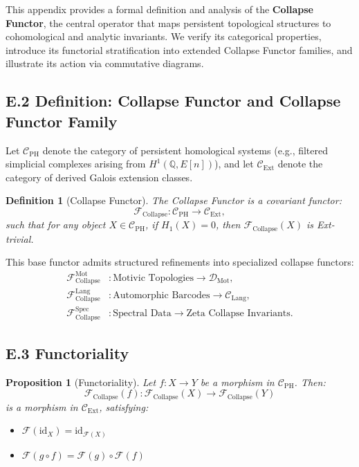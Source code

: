 \documentclass[11pt]{article}
\newtheorem{definition}[theorem]{Definition}
\newtheorem{proposition}[theorem]{Proposition}
\newcommand{\QQ}{\mathbb{Q}}
\begin{document}
This appendix provides a formal definition and analysis of the \textbf{Collapse Functor}, the central operator that maps persistent topological structures to cohomological and analytic invariants.  
We verify its categorical properties, introduce its functorial stratification into extended Collapse Functor families, and illustrate its action via commutative diagrams.

\subsection*{E.2 Definition: Collapse Functor and Collapse Functor Family}

Let $\mathcal{C}_{\mathrm{PH}}$ denote the category of persistent homological systems (e.g., filtered simplicial complexes arising from $H^1(\QQ, E[n])$), and let $\mathcal{C}_{\mathrm{Ext}}$ denote the category of derived Galois extension classes.

\begin{definition}[Collapse Functor]
The \emph{Collapse Functor} is a covariant functor:
\[
\mathcal{F}_{\mathrm{Collapse}} : \mathcal{C}_{\mathrm{PH}} \longrightarrow \mathcal{C}_{\mathrm{Ext}},
\]
such that for any object $X \in \mathcal{C}_{\mathrm{PH}}$, if $H_1(X) = 0$, then $\mathcal{F}_{\mathrm{Collapse}}(X)$ is Ext-trivial.
\end{definition}

This base functor admits structured refinements into specialized collapse functors:
\begin{align*}
\mathcal{F}_{\mathrm{Collapse}}^{\mathrm{Mot}} &: \text{Motivic Topologies} \to \mathcal{D}_{\mathrm{Mot}}, \\
\mathcal{F}_{\mathrm{Collapse}}^{\mathrm{Lang}} &: \text{Automorphic Barcodes} \to \mathcal{C}_{\mathrm{Lang}}, \\
\mathcal{F}_{\mathrm{Collapse}}^{\mathrm{Spec}} &: \text{Spectral Data} \to \text{Zeta Collapse Invariants}.
\end{align*}

\subsection*{E.3 Functoriality}

\begin{proposition}[Functoriality]
\label{prop:collapse-functoriality}
Let $f: X \to Y$ be a morphism in $\mathcal{C}_{\mathrm{PH}}$.  
Then:
\[
\mathcal{F}_{\mathrm{Collapse}}(f) : \mathcal{F}_{\mathrm{Collapse}}(X) \to \mathcal{F}_{\mathrm{Collapse}}(Y)
\]
is a morphism in $\mathcal{C}_{\mathrm{Ext}}$, satisfying:
\begin{itemize}
  \item $\mathcal{F}(\mathrm{id}_X) = \mathrm{id}_{\mathcal{F}(X)}$
  \item $\mathcal{F}(g \circ f) = \mathcal{F}(g) \circ \mathcal{F}(f)$
\end{itemize}
\end{proposition}
\end{document}
